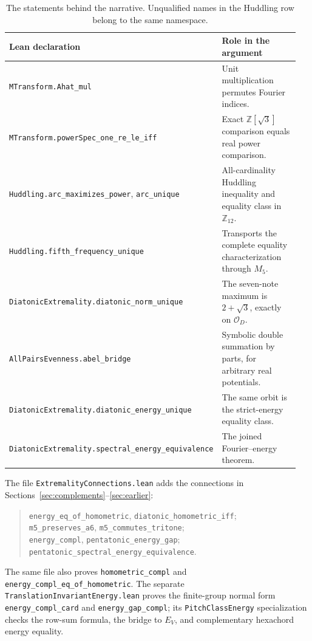 \documentclass[11pt]{article}
\newcommand{\lean}[1]{\texttt{#1}}
\newcommand{\Ztwelve}{\mathbb{Z}_{12}}
\newcommand{\orb}{\mathcal O_D}
\begin{document}
\begin{table}[!htb]\centering
{}\footnotesize
\begin{tabular}{@{}p{0.47\linewidth}p{0.48\linewidth}@{}}\toprule
\rowcolor{ctA!22}
\textbf{Lean declaration} & \textbf{Role in the argument}\\\midrule
\lean{MTransform.Ahat\_mul} & Unit multiplication permutes Fourier indices.\\
\lean{MTransform.powerSpec\_one\_re\_le\_iff} & Exact $\mathbb Z[\sqrt3]$ comparison equals real power comparison.\\
\lean{Huddling.arc\_maximizes\_power}, \lean{arc\_unique} & All-cardinality Huddling inequality and equality class in $\Ztwelve$.\\
\lean{Huddling.fifth\_frequency\_unique} & Transports the complete equality characterization through $M_5$.\\
\lean{DiatonicExtremality.diatonic\_norm\_unique} & The seven-note maximum is $2+\sqrt3$, exactly on $\orb$.\\
\lean{AllPairsEvenness.abel\_bridge} & Symbolic double summation by parts, for arbitrary real potentials.\\
\lean{DiatonicExtremality.diatonic\_energy\_unique} & The same orbit is the strict-energy equality class.\\
\lean{DiatonicExtremality.}\newline\lean{spectral\_energy\_equivalence} & The joined Fourier--energy theorem.\\\bottomrule
\end{tabular}
\caption{The statements behind the narrative. Unqualified names in the Huddling row
belong to the same namespace.}
\label{tab:lean}
\end{table}

The file \lean{ExtremalityConnections.lean} adds
the connections in Sections~\ref{sec:complements}--\ref{sec:earlier}:
\begin{quote}\small
\lean{energy\_eq\_of\_homometric}, \lean{diatonic\_homometric\_iff};\\
\lean{m5\_preserves\_a6}, \lean{m5\_commutes\_tritone};\\
\lean{energy\_compl}, \lean{pentatonic\_energy\_gap};\\
\lean{pentatonic\_spectral\_energy\_equivalence}.
\end{quote}
The same file also proves \lean{homometric\_compl} and
\lean{energy\_compl\_eq\_of\_homometric}. The separate
\lean{TranslationInvariantEnergy.lean} proves the finite-group normal form
\lean{energy\_compl\_card} and \lean{energy\_gap\_compl}; its
\lean{PitchClassEnergy} specialization checks the row-sum formula,
the bridge to $E_V$, and complementary hexachord energy equality.
\end{document}
